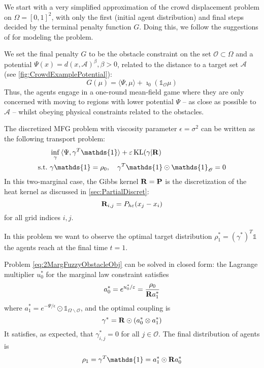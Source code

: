 \documentclass[../report.tex]{subfiles}
\begin{document}
We start with a very simplified approximation of the crowd displacement problem on $\Omega = [0, 1]^2$, with only the first (initial agent distribution) and final steps decided by the terminal penalty function $G$. Doing this, we follow the suggestions of \textcite{benamou:hal-01295299} for modeling the problem.


We set the final penalty $G$ to be the obstacle constraint on the set $\mathscr{O}\subset\Omega$ and a potential $\Psi(x) = d(x, \mathscr A)^{\beta}, \beta > 0$, related to the distance to a target set $\mathscr{A}$ (see \cref{fig:CrowdExamplePotential}):
\[
	G(\mu) = \langle \Psi, \mu\rangle + \imath_{0}(\mathds{1}_{\mathscr O}\mu)
\]
Thus, the agents engage in a one-round mean-field game where they are only concerned with moving to regions with lower potential $\Psi$ -- as close as possible to $\mathscr{A}$ -- whilst obeying physical constraints related to the obstacles.


The discretized MFG problem with viscosity parameter $\epsilon = \sigma^2$ can be written as the following transport problem:
\begin{equation}\label{eq:2MargFuzzyObstacleObj}
\begin{aligned}
	&\inf_\gamma{} \langle \Psi, \gamma^T\mathds{1}\rangle + \epsilon \KL(\gamma | \bfR) \\
	\suchthat\ & \gamma\mathds{1} = \rho_0, \quad \gamma^T\mathds{1} \odot \mathds{1}_{\mathscr{O}} = 0
	\end{aligned}
\end{equation}
In this two-marginal case, the Gibbs kernel $\mathbf{R} = \mathbf{P}$ is the discretization of the heat kernel as discussed in \cref{sec:PartialDiscret}:
\[
	\mathbf{R}_{i,j} = P_{h\varepsilon}(x_j - x_i)
\]
for all grid indices $i,j$.



In this problem we want to observe the optimal target distribution $\rho^*_1 = (\gamma^*)^T\mathds{1}$ the agents reach at the final time $t=1$.

\begin{prop}\label{thm:2MargFuzzyTarget}
Problem \eqref{eq:2MargFuzzyObstacleObj} can be solved in closed form: the Lagrange multiplier $u_0^*$ for the marginal law constraint satisfies
\[
	a_0^* = e^{u_0^*/\varepsilon}  = \frac{\rho_0}{\mathbf{R} a^*_1}
\]
where $a^*_1 = e^{-\Psi/\epsilon}\odot\mathds{1}_{\Omega\backslash\mathscr{O}}$, and the optimal coupling is
\[
	\gamma^* = \mathbf{R}\odot (a_0^* \otimes a_1^*)	
\]
It satisfies, as expected, that $\gamma^*_{i,j} = 0$ for all $j\in\mathscr{O}$. The final distribution of agents is
\[
	\rho_1 = \gamma^T\mathds{1} = a_1^* \odot \bfR a_0^*
\]
\end{prop}
 
\end{document}
